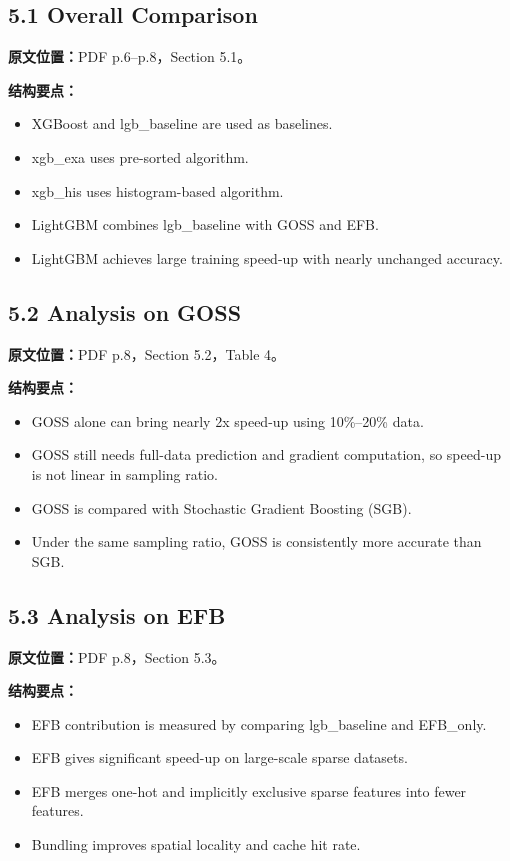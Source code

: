 \subsection{5.1 Overall Comparison}

\textbf{原文位置：}PDF p.6--p.8，Section 5.1。

\textbf{结构要点：}
\begin{itemize}
  \item XGBoost and lgb\_baseline are used as baselines.
  \item xgb\_exa uses pre-sorted algorithm.
  \item xgb\_his uses histogram-based algorithm.
  \item LightGBM combines lgb\_baseline with GOSS and EFB.
  \item LightGBM achieves large training speed-up with nearly unchanged accuracy.
\end{itemize}

\subsection{5.2 Analysis on GOSS}

\textbf{原文位置：}PDF p.8，Section 5.2，Table 4。

\textbf{结构要点：}
\begin{itemize}
  \item GOSS alone can bring nearly 2x speed-up using 10\%--20\% data.
  \item GOSS still needs full-data prediction and gradient computation, so speed-up is not linear in sampling ratio.
  \item GOSS is compared with Stochastic Gradient Boosting (SGB).
  \item Under the same sampling ratio, GOSS is consistently more accurate than SGB.
\end{itemize}

\subsection{5.3 Analysis on EFB}

\textbf{原文位置：}PDF p.8，Section 5.3。

\textbf{结构要点：}
\begin{itemize}
  \item EFB contribution is measured by comparing lgb\_baseline and EFB\_only.
  \item EFB gives significant speed-up on large-scale sparse datasets.
  \item EFB merges one-hot and implicitly exclusive sparse features into fewer features.
  \item Bundling improves spatial locality and cache hit rate.
\end{itemize}

